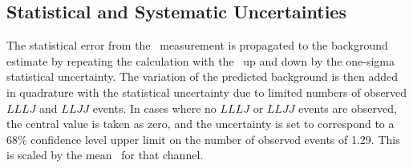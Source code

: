 

\subsection{Statistical and Systematic Uncertainties}

The statistical error from the \ffactor\ measurement is propagated to the
background estimate by repeating the calculation with the \ffactor\ up and down
by the one-sigma statistical uncertainty. The variation of the predicted
background is then added in quadrature with the statistical uncertainty due to
limited numbers of observed $LLLJ$ and $LLJJ$ events. In cases where no $LLLJ$
or $LLJJ$ events are observed, the central value is taken as zero, and the
uncertainty is set to correspond to a 68\% confidence level upper limit on the
number of observed events of 1.29. This is scaled by the mean \ffactor\ for that
channel.

